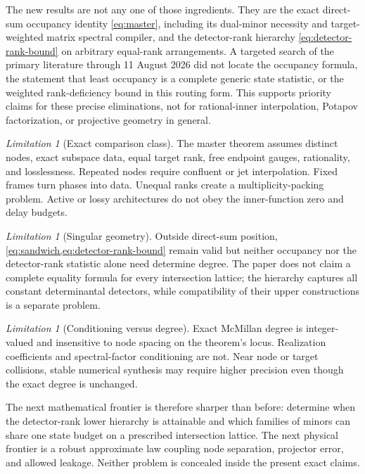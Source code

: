 \documentclass[11pt]{article}
\theoremstyle{definition}\newtheorem{definition}[theorem]{Definition}\newtheorem{example}[theorem]{Example}
\theoremstyle{remark}\newtheorem{remark}[theorem]{Remark}\newtheorem{limitation}[theorem]{Limitation}
\begin{document}
The new results are not any one of those ingredients.  They are the exact
direct-sum occupancy identity \eqref{eq:master}, including its dual-minor
necessity and target-weighted matrix spectral compiler, and the
detector-rank hierarchy \eqref{eq:detector-rank-bound} on arbitrary
equal-rank arrangements.  A targeted search of the primary literature
through 11 August 2026 did not locate the occupancy formula, the statement
that least occupancy is a complete generic state statistic, or the weighted
rank-deficiency bound in this routing form.  This supports priority claims
for these precise eliminations, not for rational-inner interpolation,
Potapov factorization, or projective geometry in general.

\begin{limitation}[Exact comparison class]
The master theorem assumes distinct nodes, exact subspace data, equal target
rank, free endpoint gauges, rationality, and losslessness.  Repeated nodes
require confluent or jet interpolation.  Fixed frames turn phases into data.
Unequal ranks create a multiplicity-packing problem.  Active or lossy
architectures do not obey the inner-function zero and delay budgets.
\end{limitation}

\begin{limitation}[Singular geometry]
Outside direct-sum position, \cref{eq:sandwich,eq:detector-rank-bound} remain
valid but neither occupancy nor the detector-rank statistic alone need
determine degree.  The paper does not claim a complete equality formula for
every intersection lattice; the hierarchy captures all constant
determinantal detectors, while compatibility of their upper constructions
is a separate problem.
\end{limitation}

\begin{limitation}[Conditioning versus degree]
Exact McMillan degree is integer-valued and insensitive to node spacing on
the theorem's locus.  Realization coefficients and spectral-factor
conditioning are not.  Near node or target collisions, stable numerical
synthesis may require higher precision even though the exact degree is
unchanged.
\end{limitation}

The next mathematical frontier is therefore sharper than before: determine
when the detector-rank lower hierarchy is attainable and which families of
minors can share one state budget on a prescribed intersection lattice.  The
next physical frontier is a robust approximate law coupling node separation,
projector error, and allowed leakage.  Neither problem is concealed inside
the present exact claims.
\end{document}
